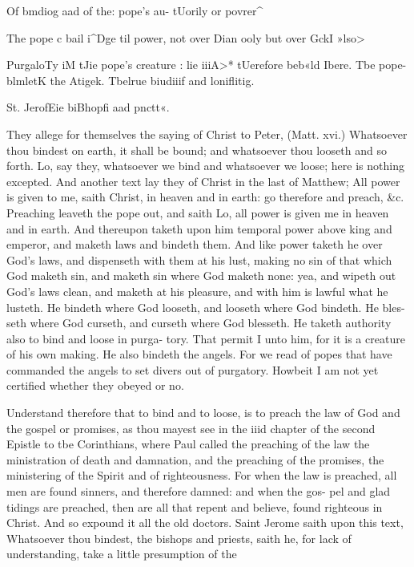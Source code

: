 \documentclass{custom}
\begin{document}
{Of bmdiog 
aad of the: 
pope's au- 
tUorily or 
povrer^ 

The pope 
c bail i^Dge til 
power, not 
over Dian 
ooly but 
over GckI 
»lso> 

PurgaloTy 
iM tJie 
pope's 
creature : 
lie iiiA>* 
tUerefore 
beb«ld 
Ibere. 
Tbe pope- 
blmletK the 
Atigek. 
Tbelrue 
biudiiif and 
loniflitig. 

St. JerofEie 
biBhopfi aad 
pnctt«. 

They allege for themselves the saying of Christ to 
Peter, (Matt. xvi.) Whatsoever thou bindest on earth, it 
shall be bound; and whatsoever thou looseth and so forth. 
Lo, say they, whatsoever we bind and whatsoever we loose; 
here is nothing excepted. And another text lay they of 
Christ in the last of Matthew; All power is given to me, 
saith Christ, in heaven and in earth: go therefore and 
preach, &c. Preaching leaveth the pope out, and saith 
Lo, all power is given me in heaven and in earth. And 
thereupon taketh upon him temporal power above king and 
emperor, and maketh laws and bindeth them. And like 
power taketh he over God's laws, and dispenseth with them 
at his lust, making no sin of that which God maketh sin, 
and maketh sin where God maketh none: yea, and wipeth 
out God's laws clean, and maketh at his pleasure, and 
with him is lawful what he lusteth. He bindeth where 
God looseth, and looseth where God bindeth. He bles- 
seth where God curseth, and curseth where God blesseth. 
He taketh authority also to bind and loose in purga- 
tory. That permit I unto him, for it is a creature of his 
own making. He also bindeth the angels. For we read 
of popes that have commanded the angels to set divers 
out of purgatory. Howbeit I am not yet certified whether 
they obeyed or no. 

Understand therefore that to bind and to loose, is to 
preach the law of God and the gospel or promises, as thou 
mayest see in the iiid chapter of the second Epistle to tbe 
Corinthians, where Paul called the preaching of the law the 
ministration of death and damnation, and the preaching 
of the promises, the ministering of the Spirit and of 
righteousness. For when the law is preached, all men are 
found sinners, and therefore damned: and when the gos- 
pel and glad tidings are preached, then are all that repent 
and believe, found righteous in Christ. And so expound 
it all the old doctors. Saint Jerome saith upon this text, 
Whatsoever thou bindest, the bishops and priests, saith he, 
for lack of understanding, take a little presumption of the 


}
\end{document}
